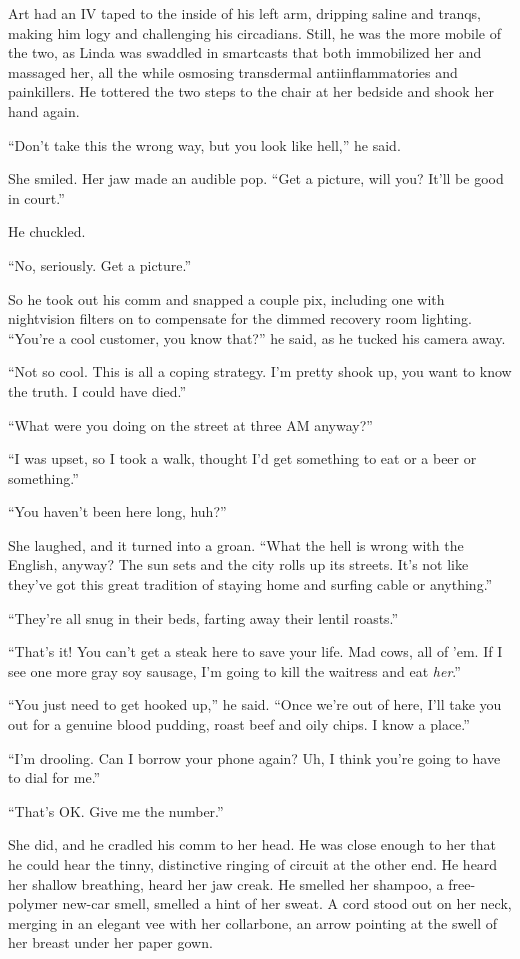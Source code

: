 Art had an IV taped to the inside of his left arm, dripping saline
and tranqs, making him logy and challenging his circadians. Still,
he was the more mobile of the two, as Linda was swaddled in
smartcasts that both immobilized her and massaged her, all the
while osmosing transdermal antiinflammatories and painkillers. He
tottered the two steps to the chair at her bedside and shook her
hand again.

“Don’t take this the wrong way, but you look like hell,” he said.

She smiled. Her jaw made an audible pop. “Get a picture, will you?
It’ll be good in court.”

He chuckled.

“No, seriously. Get a picture.”

So he took out his comm and snapped a couple pix, including one
with nightvision filters on to compensate for the dimmed recovery
room lighting. “You’re a cool customer, you know that?” he said, as
he tucked his camera away.

“Not so cool. This is all a coping strategy. I’m pretty shook up,
you want to know the truth. I could have died.”

“What were you doing on the street at three AM anyway?”

“I was upset, so I took a walk, thought I’d get something to eat or
a beer or something.”

“You haven’t been here long, huh?”

She laughed, and it turned into a groan. “What the hell is wrong
with the English, anyway? The sun sets and the city rolls up its
streets. It’s not like they’ve got this great tradition of staying
home and surfing cable or anything.”

“They’re all snug in their beds, farting away their lentil
roasts.”

“That’s it! You can’t get a steak here to save your life. Mad cows,
all of ’em. If I see one more gray soy sausage, I’m going to kill
the waitress and eat \emph{her}.”

“You just need to get hooked up,” he said. “Once we’re out of here,
I’ll take you out for a genuine blood pudding, roast beef and oily
chips. I know a place.”

“I’m drooling. Can I borrow your phone again? Uh, I think you’re
going to have to dial for me.”

“That’s OK. Give me the number.”

She did, and he cradled his comm to her head. He was close enough
to her that he could hear the tinny, distinctive ringing of
circuit at the other end. He heard her shallow breathing,
heard her jaw creak. He smelled her shampoo, a free-polymer new-car
smell, smelled a hint of her sweat. A cord stood out on her neck,
merging in an elegant vee with her collarbone, an arrow pointing at
the swell of her breast under her paper gown.

